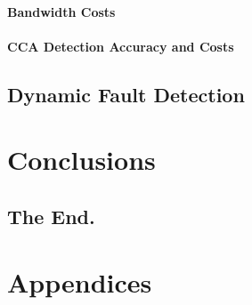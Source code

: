 \documentclass[twoside,hidelinks]{glasgowthesis}
\begin{document}
\subsection{Bandwidth Costs}
\subsection{CCA Detection Accuracy and Costs}

\chapter{Dynamic Fault Detection}

\part{Conclusions}

\chapter{The End.}


\part{Appendices}
\appendix



\newpage
\printbibliography[title={References}]
\end{document}
